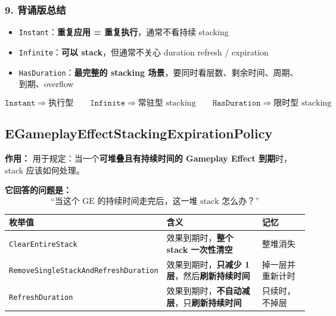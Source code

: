 \documentclass[CJKmath=true,10pt]{MyBook}
\begin{document}
\subsubsection{9. 背诵版总结}

\begin{itemize}
	\item \texttt{Instant}：\textbf{重复应用 = 重复执行}，通常不看持续 stacking
	\item \texttt{Infinite}：\textbf{可以 stack}，但通常不关心 duration refresh / expiration
	\item \texttt{HasDuration}：\textbf{最完整的 stacking 场景}，要同时看层数、剩余时间、周期、到期、overflow
\end{itemize}

\[
\boxed{
	\texttt{Instant} \Rightarrow \text{执行型}
	\qquad
	\texttt{Infinite} \Rightarrow \text{常驻型 stacking}
	\qquad
	\texttt{HasDuration} \Rightarrow \text{限时型 stacking}
}
\]



\subsection{EGameplayEffectStackingExpirationPolicy}

\textbf{作用：}  
用于规定：当一个\textbf{可堆叠且有持续时间的 Gameplay Effect 到期}时，stack 应该如何处理。

\vspace{0.5em}
\textbf{它回答的问题是：}
\[
\text{“当这个 GE 的持续时间走完后，这一堆 stack 怎么办？”}
\]

\begin{longtable}{@{}p{}p{}p{}@{}}
	\toprule
	\textbf{枚举值} & \textbf{含义} & \textbf{记忆} \\
	\midrule
	\endhead
	
	\texttt{ClearEntireStack}
	&
	效果到期时，\textbf{整个 stack 一次性清空}
	&
	整堆消失
	\\
	
	\texttt{RemoveSingleStackAndRefreshDuration}
	&
	效果到期时，\textbf{只减少 1 层}，然后\textbf{刷新持续时间}
	&
	掉一层并重新计时
	\\
	
	\texttt{RefreshDuration}
	&
	效果到期时，\textbf{不自动减层}，只\textbf{刷新持续时间}
	&
	只续时，不掉层
	\\
	
	\bottomrule
\end{longtable}
\end{document}
